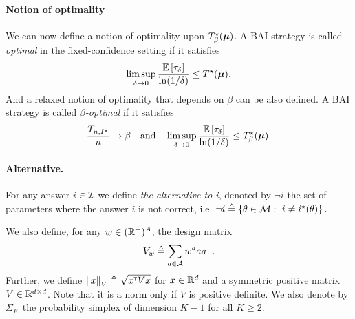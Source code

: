 \paragraph{Notion of optimality}
We can now define a notion of optimality upon $T^\star_\beta({\boldsymbol \mu})$. A BAI strategy is called \emph{optimal} in the fixed-confidence setting if it satisfies
\[
    \limsup_{\delta \rightarrow 0}\frac{\mathbb{E}\left[\tau_\delta\right]}{\ln(1/\delta)} \leq T^\star({\boldsymbol \mu}).
\]
And a relaxed notion of optimality that depends on $\beta$ can be also defined. A BAI strategy is called \emph{$\beta$-optimal} if it satisfies 
\[
    \frac{T_{n,I^\star}}{n}\rightarrow \beta \quad \text{and} \quad \limsup_{\delta \rightarrow 0}\frac{\mathbb{E}\left[\tau_\delta\right]}{\ln(1/\delta)} \leq T^\star_\beta({\boldsymbol \mu}).
\]

\paragraph{Alternative.}
For any answer $i\in\mathcal{I}$ we define \emph{the alternative to i}, denoted by $\neg i$ the set of parameters where the answer $i$ is not correct, i.e.
$%
\neg i \eqdef \{\theta\in\cM:\ i\neq\istar(\theta)\}\,.
$%

We also define, for any $w\in(\mathbb{R}^+)^A$, the design matrix
\[V_w \triangleq \sum_{a\in \mathcal{A}} w^a a a^{\mathsf{\scriptscriptstyle T}}\,.\]
Further, we define $\left\lVert x\right\rVert_V\triangleq \sqrt{x^{\mathsf{\scriptscriptstyle T}} Vx}$ for $x\in\mathbb{R}^d$ and a symmetric positive matrix $V\in\mathbb{R}^{d\times d}$. Note that it is a norm only if $V$ is positive definite. We also denote by $\Sigma_K$ the probability simplex of dimension $K-1$ for all $K\ge 2$.

